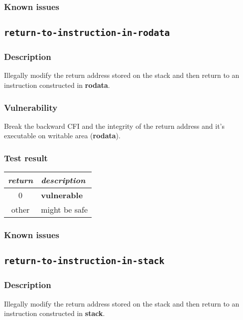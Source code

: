 \documentclass[a4paper]{book}
\begin{document}
\subsubsection{Known issues}

\newpage
\subsection{\texttt{return-to-instruction-in-rodata}}\label{test-return-to-instruction-in-rodata}

\subsubsection{Description}
Illegally modify the return address stored on the stack and then return to  an instruction constructed in \textbf{rodata}.

\subsubsection{Vulnerability}
Break the backward CFI and the integrity of the return address and it’s  executable on writable area (\textbf{rodata}).

\subsubsection{Test result}
\begin{tabular}{cl}
  \toprule
  \emph{return}  & \emph{description} \\
  \midrule
  0              & \textbf{vulnerable} \\
  other          & might be safe \\
  \bottomrule
\end{tabular}
  
\subsubsection{Known issues}

\newpage
\subsection{\texttt{return-to-instruction-in-stack}}\label{test-return-to-instruction-in-stack}

\subsubsection{Description}
Illegally modify the return address stored on the stack and then return to  an instruction constructed in \textbf{stack}.
\end{document}
